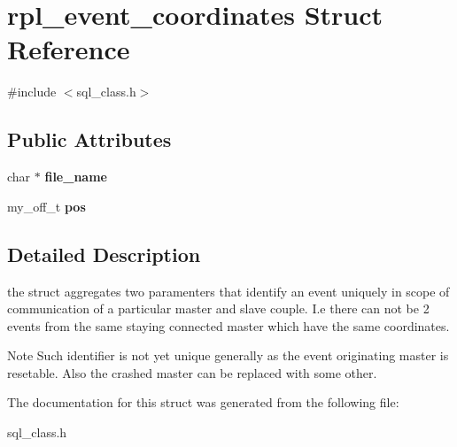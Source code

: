 \hypertarget{structrpl__event__coordinates}{}\section{rpl\+\_\+event\+\_\+coordinates Struct Reference}
\label{structrpl__event__coordinates}


{\ttfamily \#include $<$sql\+\_\+class.\+h$>$}

\subsection*{Public Attributes}
\begin{DoxyCompactItemize}
\item 
\mbox{\label{structrpl__event__coordinates_aa9adb347385c31e998f55f447eda8c4e}} 
char $\ast$ {\bfseries file\+\_\+name}
\item 
\mbox{\label{structrpl__event__coordinates_a819645c3714eaa0680bb1518e09be0d9}} 
my\+\_\+off\+\_\+t {\bfseries pos}
\end{DoxyCompactItemize}


\subsection{Detailed Description}
the struct aggregates two paramenters that identify an event uniquely in scope of communication of a particular master and slave couple. I.\+e there can not be 2 events from the same staying connected master which have the same coordinates. \begin{DoxyNote}{Note}
Such identifier is not yet unique generally as the event originating master is resetable. Also the crashed master can be replaced with some other. 
\end{DoxyNote}


The documentation for this struct was generated from the following file\+:\begin{DoxyCompactItemize}
\item 
sql\+\_\+class.\+h\end{DoxyCompactItemize}
